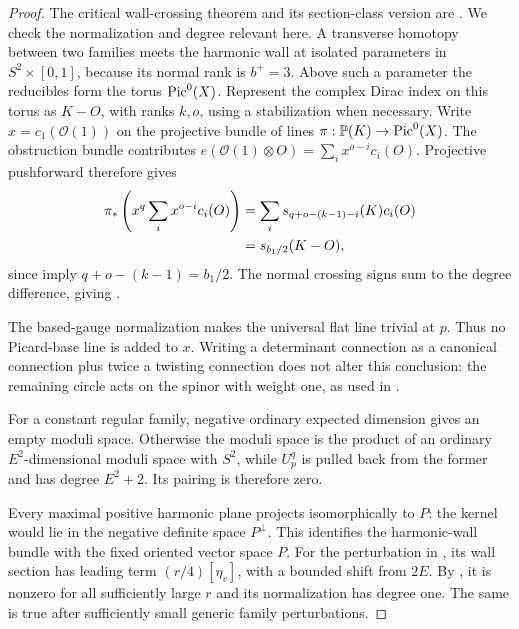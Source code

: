 \begin{proof}
The critical wall-crossing theorem and its section-class version are
\cite[Theorem~4.10 and Proposition~4.11]{LiLiu2001}.  We check the
normalization and degree relevant here.
A transverse homotopy between two families meets the harmonic wall
at isolated parameters in \(S^2\times[0,1]\), because its normal
rank is \(b^+=3\).  Above such a parameter the reducibles form the
torus \(\operatorname{Pic}^0(X)\).  Represent the complex Dirac index on this
torus as \(K-O\), with ranks \(k,o\), using a stabilization when
necessary.  Write \(x=c_1(\mathcal O(1))\) on the projective
bundle of lines \(\pi:\mathbb P(K)\to\operatorname{Pic}^0(X)\).
The obstruction bundle contributes
\(e(\mathcal O(1)\otimes O)=\sum_i x^{o-i}c_i(O)\).
Projective pushforward therefore gives
\begin{align}
 \label{eq:families-projective-pushforward}
 \pi_*\left(x^q\sum_i x^{o-i}c_i(O)\right)
 &=\sum_i s_{q+o-(k-1)-i}(K)c_i(O)\\
 &=s_{b_1/2}(K-O),\notag
\end{align}
since  imply
\(q+o-(k-1)=b_1/2\).
The normal crossing signs sum to the degree difference, giving
.

The based-gauge normalization makes the universal flat line trivial
at \(p\).  Thus no Picard-base line is added to \(x\).
Writing a determinant connection as a canonical connection plus
twice a twisting connection does not alter this conclusion: the
remaining circle acts on the spinor with weight one, as used in
.

For a constant regular family, negative ordinary expected dimension
gives an empty moduli space.  Otherwise the moduli space is the
product of an ordinary \(E^2\)-dimensional moduli space with
\(S^2\), while \(U_p^q\) is pulled back from the former and has
degree \(E^2+2\).  Its pairing is therefore zero.

Every maximal positive harmonic plane projects isomorphically to
\(P\): the kernel would lie in the negative definite space
\(P^\perp\).  This identifies the harmonic-wall bundle with the
fixed oriented vector space \(P\).  For the perturbation in
, its wall section has leading
term \((r/4)[\eta_v]\), with a bounded shift from \(2E\).
By , it is nonzero for all sufficiently
large \(r\) and its normalization has degree one.  The same is
true after sufficiently small generic family perturbations.
\end{proof}

